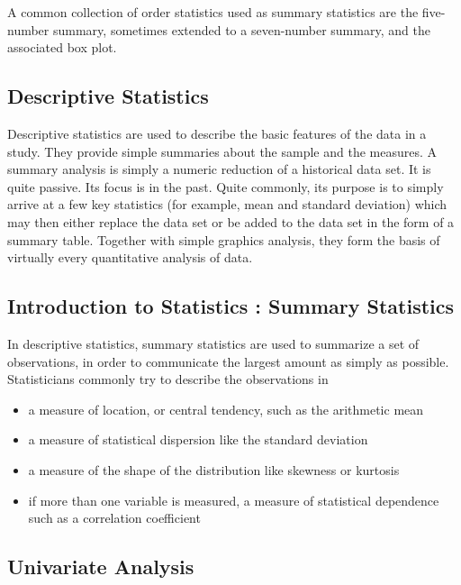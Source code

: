 \documentclass[]{report}
\begin{document}
A common collection of order statistics used as summary statistics are the five-number summary, sometimes extended to a seven-number summary, and the associated box plot.

\subsection{Descriptive Statistics}
Descriptive statistics are used to describe the basic features of the data in a study. They provide simple summaries about the sample and the measures. A summary analysis is simply a numeric reduction of a historical data set. It is quite passive. Its focus is in the past. Quite commonly, its purpose is to simply arrive at a few key statistics (for example, mean and standard deviation) which may then either replace the data set or be added to the data set in the form of a summary table. Together with simple graphics analysis, they form the basis of virtually every quantitative analysis of data.






\subsection{Introduction to Statistics : Summary Statistics}

In descriptive statistics, summary statistics are used to summarize a set of observations, in order to communicate the largest amount as simply as possible. Statisticians commonly try to describe the observations in
\begin{itemize}
\item a measure of location, or central tendency, such as the arithmetic mean
\item a measure of statistical dispersion like the standard deviation
\item a measure of the shape of the distribution like skewness or kurtosis
\item if more than one variable is measured, a measure of statistical dependence such as a correlation coefficient
\end{itemize}














\subsection{Univariate Analysis}
\end{document}
